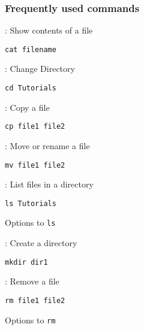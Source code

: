 \documentclass[slidestop,mathserif,compress,xcolor=svgnames]{beamer}
\newcommand*\vardiamond{\textcolor{tigerspurple}{%
  \ensuremath{\blacklozenge}}}
\begin{document}
\begin{frame}[allowframebreaks]
  \frametitle{\small Frequently used commands}
  \begin{itemize}
    {\scriptsize
    \item[\texttt{cat}]: Show contents of a file
    {\tiny \item[$\vardiamond$] \texttt{cat filename}}
    \item[\texttt{cd}]: Change Directory
    {\tiny \item[$\vardiamond$] \texttt{cd Tutorials}}
    \item[\texttt{cp}]: Copy a file
    {\tiny \item[$\vardiamond$] \texttt{cp file1 file2}}
    \item[\texttt{mv}]: Move or rename a file
    {\tiny\item[$\vardiamond$] \texttt{mv file1 file2}}
    \item[\texttt{ls}]: List files in a directory
    {\tiny
    \item[$\vardiamond$] {\tiny\texttt{ls Tutorials}}
    \item[$\vardiamond$] Options to \texttt{ls}
    \begin{enumerate}
      \fontsize{6}{8}\selectfont{
        \item[-l] show long listing format
        \item[-a] show hidden files
        \item[-r] reverse order while sorting
        \item[-t] show modification times
      }
    \end{enumerate}
    }
    \item[\texttt{mkdir}]: Create a directory
    {\tiny\item[$\vardiamond$] \texttt{mkdir dir1}}
    \framebreak
    \item[\texttt{rm}]: Remove a file
    {\tiny
    \item[$\vardiamond$] \texttt{rm file1 file2}
    \item[$\vardiamond$] Options to \texttt{rm}
    \begin{enumerate}
      \fontsize{6}{8}\selectfont{
      \item[-i] interactive
      \item[-r] remove files recursively used to delete directories and its contents
      \item[-f] force, ignore nonexistent files
      }
    \end{enumerate}
    }
}
\end{itemize}
\end{frame}
\end{document}
